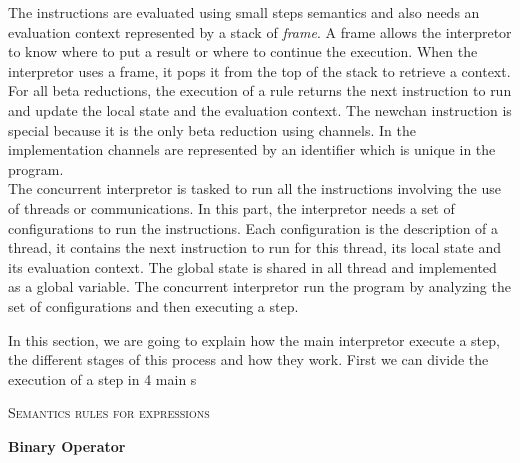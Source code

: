 \documentclass[11pt]{report}
\begin{document}
\tabto{1cm}The instructions are evaluated using small steps semantics and also needs an evaluation context represented by a stack of \textit{frame}. A frame allows the interpretor to know where to put a result or where to continue the execution. When the interpretor uses a frame, it pops it from the top of the stack to retrieve a context. For all beta reductions, the execution of a rule returns the next instruction to run and update the local state and the evaluation context.
The newchan instruction is special because it is the only beta reduction using channels. In the implementation channels are represented by an identifier which is unique in the program. \\

\tabto{1cm} The concurrent interpretor is tasked to run all the instructions involving the use of threads or communications. In this part, the interpretor needs a set of configurations to run the instructions. Each configuration is the description of a thread, it contains the next instruction to run for this thread, its local state and its evaluation context. The global state is shared in all thread and implemented as a global variable. The concurrent interpretor run the program by analyzing the set of configurations and then executing a step. \\

{}
\vspace*{3pt}
\vspace*{10pt}

\tabto{1cm}In this section, we are going to explain how the main interpretor execute a step, the different stages of this process and how they work. First we can divide the execution of a step in 4 main s   

\newpage

{}
\vspace*{3pt}
\vspace*{10pt}
\vspace*{10pt}

{}
\tabto{1cm} {\Large \textsc{Semantics rules for expressions}}
\vspace*{20pt}

\tabto{0cm} {\large \textbf{Binary Operator}}
\begin{prooftree}
\end{prooftree}
\end{document}
